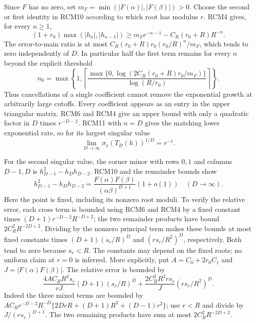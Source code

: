 \documentclass[11pt]{article}
\begin{document}
Since $F$ has no zero, set $m_F=\min(|F(\alpha)|,|F(\beta)|)>0$.
Choose the second or first identity in RCM10 according to which
root has modulus $r$.  RCM4 gives, for every $n\ge1$,
\[
 (1+r_0)\max(|h_n|,|h_{n-1}|)
 \ge m_Fr^{-n-1}-C_R(r_0+R)R^{-n}.
 \tag{RCM11}
\]
The error-to-main ratio is at most
$C_R(r_0+R)r_0(r_0/R)^n/m_F$, which tends to zero independently
of $D$.  In particular half the first term remains for every
$n$ beyond the explicit threshold
\[
 n_0=\max\left\{1,
 \left\lceil
  \frac{\max\{0,\log(2C_R(r_0+R)r_0/m_F)\}}
       {\log(R/r_0)}
 \right\rceil\right\}.
 \tag{RCM12}
\]
Thus cancellations of a single coefficient cannot remove the
exponential growth at arbitrarily large cutoffs.  Every coefficient
appears as an entry in the upper triangular matrix.  RCM6 and
RCM4 give an upper bound with only a quadratic factor in $D$
times $r^{-D-2}$.  RCM11 with $n=D$ gives the matching lower
exponential rate, so for its largest singular value
\[
 \lim_{D\to\infty}\sigma_1(T_D(h))^{1/D}=r^{-1}.
 \tag{RCM13}
\]

For the second singular value, the corner minor with rows $0,1$
and columns $D-1,D$ is $h_{D-1}^2-h_Dh_{D-2}$.
RCM10 and the remainder bounds show
\[
 h_{D-1}^2-h_Dh_{D-2}
 =\frac{F(\alpha)F(\beta)}{(\alpha\beta)^{D+1}}(1+o(1))
 \quad(D\to\infty).
 \tag{RCM14}
\]
Here the point is fixed, including its nonzero root moduli.
To verify the relative error, each cross term is bounded using
RCM6 and RCM4 by a fixed constant times
$(D+1)r^{-D-2}R^{-D+2}$; the two remainder products have
bound $2C_R^2R^{-2D+2}$.  Dividing by the nonzero principal
term makes these bounds at most fixed constants times
$(D+1)(s_r/R)^D$ and $(r s_r/R^2)^D$, respectively.
Both tend to zero because $s_r<R$.  The constants may depend
on the fixed roots; no uniform claim at $r=0$ is inferred.
More explicitly, put $A=C_0+2r_0C_1$ and
$J=|F(\alpha)F(\beta)|$. The relative error is bounded by
\[
 \frac{4AC_RR^2s_r}{rJ}(D+1)(s_r/R)^D
 +\frac{2C_R^2R^2rs_r}{J}(rs_r/R^2)^D.
\]
Indeed the three mixed terms are bounded by
$AC_Rr^{-D-2}R^{-D}\{2DrR+(D+1)R^2+(D-1)r^2\}$;
use $r<R$ and divide by $J/(rs_r)^{D+1}$.
The two remaining products have sum at most $2C_R^2R^{-2D+2}$.
\end{document}
